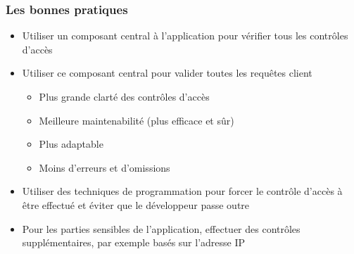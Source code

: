\documentclass[aspectratio=169]{beamer}  %
\begin{document}
\begin{frame}
  \frametitle{Les bonnes pratiques}
  \begin{exampleblock}{}
    \begin{itemize}
      \item Utiliser un composant central à l'application pour vérifier tous les contrôles d'accès
      \item Utiliser ce composant central pour valider toutes les requêtes client
      \begin{itemize}
        \item Plus grande clarté des contrôles d'accès
        \item Meilleure maintenabilité (plus efficace et sûr)
        \item Plus adaptable
        \item Moins d'erreurs et d'omissions
      \end{itemize}
    \end{itemize}
  \end{exampleblock}
  \pause
  \begin{exampleblock}{}
    \begin{itemize}
      \item Utiliser des techniques de programmation pour forcer le contrôle d'accès à être effectué et éviter que le développeur passe outre
    \end{itemize}
  \end{exampleblock}
  \pause
  \begin{exampleblock}{}
    \begin{itemize}
      \item Pour les parties sensibles de l'application, effectuer des contrôles supplémentaires, par exemple basés sur l'adresse IP
    \end{itemize}
  \end{exampleblock}
\end{frame}
\end{document}
